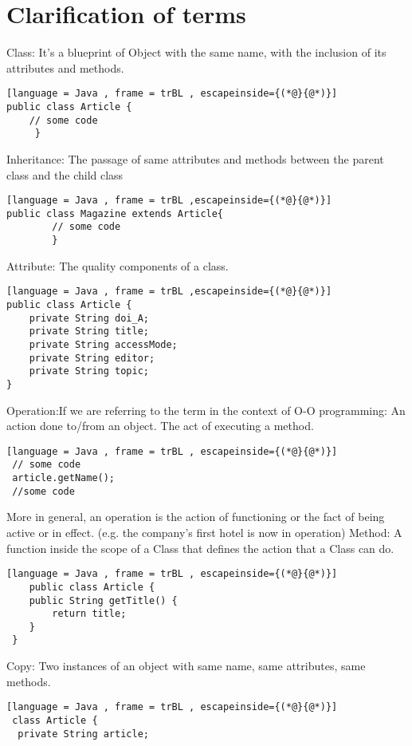 \chapter{Clarification of terms}
\begin{parlist}
	\item Class: It's a blueprint of Object with the same name, with the inclusion of its attributes and methods.\cite{Deitel:2005aa}
	\begin{lstlisting}[language = Java , frame = trBL , escapeinside={(*@}{@*)}]
public class Article {
	// some code
	 }
	\end{lstlisting}
	Inheritance: The passage of same attributes and methods between the parent class and the child class 
	\begin{lstlisting}[language = Java , frame = trBL ,escapeinside={(*@}{@*)}]
public class Magazine extends Article{
    	// some code
		}
	\end{lstlisting}
	Attribute: The quality components of a class.
	\begin{lstlisting}[language = Java , frame = trBL ,escapeinside={(*@}{@*)}]
public class Article {
    private String doi_A;
    private String title;
    private String accessMode;
    private String editor;
    private String topic;
}	
	\end{lstlisting}

 Operation:If we are referring to the term in the context of O-O programming:  An action done to/from an object. The act of executing a method.
 \begin{lstlisting}[language = Java , frame = trBL , escapeinside={(*@}{@*)}]
 // some code
 article.getName();
 //some code	
 \end{lstlisting}
 More in general, an operation is the action of functioning or the fact of being active or in effect. (e.g.  the company's first hotel is now in operation)\cite{:2011aa}
 \newpage
 Method: A function inside the scope of a Class that defines the action that a Class can do.
 \begin{lstlisting}[language = Java , frame = trBL , escapeinside={(*@}{@*)}]
 	public class Article {
 	public String getTitle() {
        return title;
    }
 }
 \end{lstlisting}

  Copy: Two instances of an object with same name, same attributes, same methods.
 \begin{lstlisting}[language = Java , frame = trBL , escapeinside={(*@}{@*)}]
 class Article {
  private String article;


\end{lstlisting}
\end{parlist}
